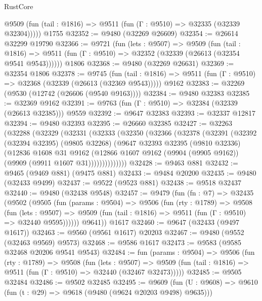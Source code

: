 \begin{lexlean}{RustCore}
\begin{coremodule}
      @9509 (fun (tail : @1816) => @9511 (fun (Γ : @9510) => @32335 (@32339 @32304)))))
    @1755
@32352 := @9480 (@32269 @26609)
@32354 := @26614 @32299 @19790
@32366 := @9721
    (fun (lets : @9507) =>
    @9509
      (fun (tail : @1816) =>
      @9511 (fun (Γ : @9510) => @32352 (@32339 (@26613 (@32354 @9541 @9543))))))
    @1806
@32368 := @9480 (@32269 @26631)
@32369 := @32354 @1806
@32378 := @9745
    (fun (tail : @1816) => @9511 (fun (Γ : @9510) => @32368 (@32339 (@26613 (@32369 @9543)))))
    @9162
@32383 := @32269 (@9530 (@12742 (@26606 (@9540 @9163))))
@32384 := @9480 @32383
@32385 := @32369 @9162
@32391 := @9763 (fun (Γ : @9510) => @32384 (@32339 (@26613 @32385))) @9559
@32392 := @9647 @32383
@32393 := @32337 @12817
@32394 := @9480 @32393
@32395 := @26660 @32385
@32427 := @32263
    (@32288
      (@32329
        (@32331
          (@32333
            (@32350
              (@32366
                (@32378
                  (@32391
                    (@32392
                      (@32394 @32395)
                      (@9805 @32268)
                      (@9647
                        @32393
                        @32395
                        (@9810 @32336)
                        (@12836
                          @1608
                          @31
                          @9162
                          (@12866
                            @1607
                            @9162
                            (@9904 (@9905 @9162))
                            (@9909 (@9911 @1607 @31))))))))))))))
@32428 := @9463 @881
@32432 := @9465 (@9469 @881) (@9475 @881)
@32433 := @9484 @20200
@32435 := @9480 (@32433 @9499)
@32437 := @9522 (@9523 @881)
@32438 := @9518 @32437
@32440 := @9480 (@32438 @9548)
@32457 := @9479
    (fun (fn : @7) =>
    @32435
      (@9502
        (@9505
          (fun (params : @9504) =>
          @9506
            (fun (rty : @1789) =>
            @9508
              (fun (lets : @9507) =>
              @9509 (fun (tail : @1816) => @9511 (fun (Γ : @9510) => @32440 @9595))))))
        @9641))
    @1617
@32460 := @9647 (@32433 (@9497 @1617))
@32463 := @9560 (@9561 @1617) @20203
@32467 := @9480 (@9552 (@32463 @9569) @9573)
@32468 := @9586 @1617
@32473 := @9583 (@9585 @32468 @20206 @9541 @9543)
@32484 := fun (params : @9504) =>
  @9506
    (fun (rty : @1789) =>
    @9508
      (fun (lets : @9507) =>
      @9509 (fun (tail : @1816) => @9511 (fun (Γ : @9510) => @32440 (@32467 @32473)))))
@32485 := @9505 @32484
@32486 := @9502 @32485
@32495 := @9609
    (fun (U : @9608) => @9610 (fun (t : @29) => @9618 (@9480 (@9624 @20203 @9498) @9635)))

\end{coremodule}
\end{lexlean}
